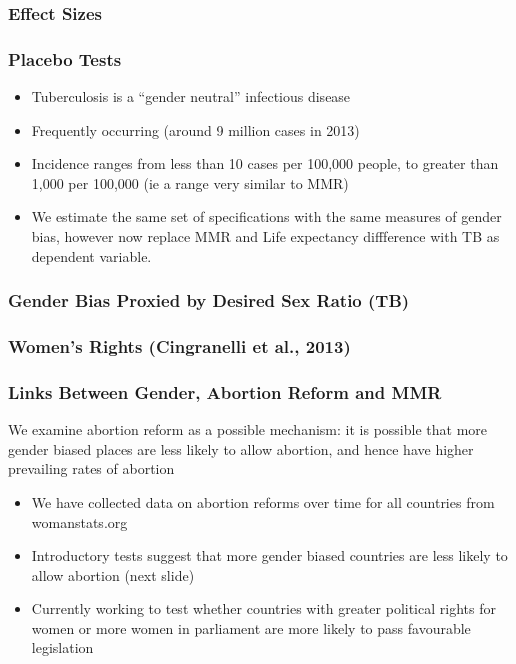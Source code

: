 \documentclass[legno]{beamer}
\begin{document}
\begin{frame}
\frametitle{Effect Sizes}
\end{frame}


\begin{frame}
\frametitle{Placebo Tests}
\begin{itemize}
\item Tuberculosis is a ``gender neutral'' infectious disease
\item Frequently occurring (around 9 million cases in 2013)
\item Incidence ranges from less than 10 cases per 100,000 people, to greater than 1,000 per 100,000 (ie a range very similar to MMR)
\item We estimate the same set of specifications with the same measures of gender bias, however now replace MMR and Life expectancy diffference with TB as dependent variable.
\end{itemize}
\end{frame}


\begin{frame}
\frametitle{Gender Bias Proxied by Desired Sex Ratio (TB)}

\end{frame}
\begin{frame}
\frametitle{Women's Rights (Cingranelli et al., 2013)}

\end{frame}
\begin{frame}[plain]

\end{frame}

\begin{frame}
\frametitle{Links Between Gender, Abortion Reform and MMR}
We examine abortion reform as a possible mechanism: it is possible that more gender biased places are less likely to allow abortion, and hence have higher prevailing rates of abortion
\vspace{5mm}
\begin{itemize}
\item We have collected data on abortion reforms over time for all countries from womanstats.org
\item Introductory tests suggest that more gender biased countries are less likely to allow abortion (next slide)
\item Currently working to test whether countries with greater political rights for women or more women in parliament are more likely to pass favourable legislation
\end{itemize}
\end{frame}
\end{document}
